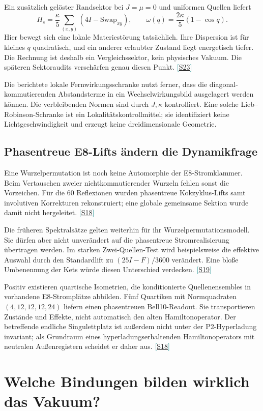 \documentclass[11pt,a4paper,oneside,parskip=half,headings=normal,numbers=noenddot,bibliography=totoc]{scrreprt}
\newcommand{\src}[1]{\textcolor{teal}{\small[\hyperref[s:#1]{S#1}]}}
\begin{document}
Ein zusätzlich gelöster Randsektor bei $J=\mu=0$ und uniformen Quellen liefert
\[
 H_s=\frac{\kappa}{5}\sum_{(x,y)}(4I-\mathrm{Swap}_{xy}),
 \qquad\omega(q)=\frac{2\kappa}{5}(1-\cos q).
\]
Hier bewegt sich eine lokale Materiestörung tatsächlich. Ihre Dispersion ist für kleines $q$ quadratisch, und ein anderer erlaubter Zustand liegt energetisch tiefer. Die Rechnung ist deshalb ein Vergleichssektor, kein physisches Vakuum. Die späteren Sektoraudits verschärfen genau diesen Punkt. \src{23}

Die berichtete lokale Fernwirkungsschranke nutzt ferner, dass die diagonal-kommutierenden Abstandsterme in ein Wechselwirkungsbild ausgelagert werden können. Die verbleibenden Normen sind durch $J,\kappa$ kontrolliert. Eine solche Lieb--Robinson-Schranke ist ein Lokalitätskontrollmittel; sie identifiziert keine Lichtgeschwindigkeit und erzeugt keine dreidimensionale Geometrie.

\section{Phasentreue E8-Lifts ändern die Dynamikfrage}
Eine Wurzelpermutation ist noch keine Automorphie der E8-Stromklammer. Beim Vertauschen zweier nichtkommutierender Wurzeln fehlen sonst die Vorzeichen. Für die 60 Reflexionen wurden phasentreue Kokzyklus-Lifts samt involutiven Korrekturen rekonstruiert; eine globale gemeinsame Sektion wurde damit nicht hergeleitet. \src{18}

Die früheren Spektralsätze gelten weiterhin für ihr Wurzelpermutationsmodell. Sie dürfen aber nicht unverändert auf die phasentreue Stromrealisierung übertragen werden. Im starken Zwei-Quellen-Test wird beispielsweise die effektive Auswahl durch den Standardlift zu $(25I-F)/3600$ verändert. Eine bloße Umbenennung der Kets würde diesen Unterschied verdecken. \src{19}

Positiv existieren quartische Isometrien, die konditionierte Quellenensembles in vorhandene E8-Stromplätze abbilden. Fünf Quartiken mit Normquadraten $(4,12,12,12,24)$ liefern einen phasentreuen Bell10-Readout. Sie transportieren Zustände und Effekte, nicht automatisch den alten Hamiltonoperator. Der betreffende endliche Singulettplatz ist außerdem nicht unter der P2-Hyperladung invariant; als Grundraum eines hyperladungserhaltenden Hamiltonoperators mit neutralen Außenregistern scheidet er daher aus. \src{18}

\chapter{Welche Bindungen bilden wirklich das Vakuum?}
\end{document}
